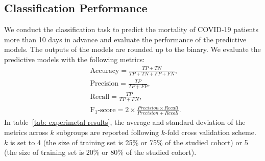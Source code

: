 \subsection{Classification Performance}
We conduct the classification task to predict the mortality of COVID-19 patients more than 10 days in advance and evaluate the performance of the predictive models. The outputs of the models are rounded up to the binary. We evaluate the predictive models with the following metrics:
\begin{equation}
\begin{aligned}
    &\text{Accuracy} = \frac{TP + TN}{TP + TN + FP + FN},\\
    &\text{Precision} = \frac{TP}{TP + FP},\\
    &\text{Recall} = \frac{TP}{TP + FN},\\
    &\text{F}_1\text{-score} = 2 \times \frac{Precision \times Recall}{Precision + Recall}.
\end{aligned}
\end{equation}
In table~\ref{tab: experimetal results}, the average and standard deviation of the metrics across $k$ subgroups are reported following $k$-fold cross validation scheme. $k$ is set to 4 (the size of training set is 25\% or 75\% of the studied cohort) or 5 (the size of training set is 20\% or 80\% of the studied cohort).
